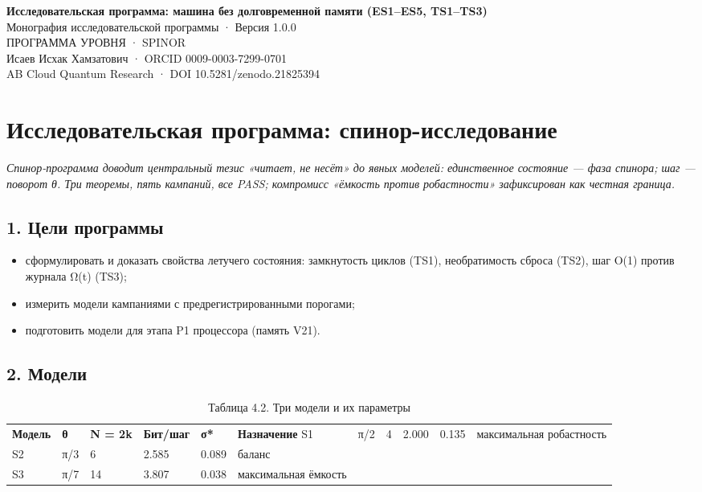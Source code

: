 \documentclass[11pt,a4paper]{article}
\begin{document}
\begin{center}
{\LARGE\bfseries Исследовательская программа: машина без долговременной памяти (ES1–ES5, TS1–TS3)}\\[8pt]
{\large Монография исследовательской программы · Версия 1.0.0}\\[6pt]
{\color{copper}\small ПРОГРАММА УРОВНЯ · SPINOR}\\[4pt]
{\small Исаев Исхак Хамзатович · ORCID 0009-0003-7299-0701}\\[2pt]
{\small AB Cloud Quantum Research · DOI 10.5281/zenodo.21825394}
\end{center}

\tableofcontents
\newpage

\section{Исследовательская программа: спинор-исследование}

\noindent\textit{\color{copper}Спинор-программа доводит центральный тезис «читает, не несёт» до явных моделей: единственное состояние — фаза спинора; шаг — поворот θ. Три теоремы, пять кампаний, все PASS; компромисс «ёмкость против робастности» зафиксирован как честная граница.}

\subsection{1. Цели программы}

\begin{itemize}
  \item сформулировать и доказать свойства летучего состояния: замкнутость циклов (TS1), необратимость сброса (TS2), шаг O(1) против журнала Ω(t) (TS3);
  \item измерить модели кампаниями с предрегистрированными порогами;
  \item подготовить модели для этапа P1 процессора (память V21).
\end{itemize}

\subsection{2. Модели}

\begin{table}[htbp]\centering\small
\caption{Таблица 4.2. Три модели и их параметры}
\begin{tabular}{p{} p{} p{} p{} p{} p{}}
\toprule
\textbf{Модель} & \textbf{θ} & \textbf{N = 2k} & \textbf{Бит/шаг} & \textbf{σ*} & \textbf{Назначение}
\midrule
S1 & π/2 & 4 & 2.000 & 0.135 & максимальная робастность \\
S2 & π/3 & 6 & 2.585 & 0.089 & баланс \\
S3 & π/7 & 14 & 3.807 & 0.038 & максимальная ёмкость \\
\bottomrule
\end{tabular}
\end{table}
\end{document}
